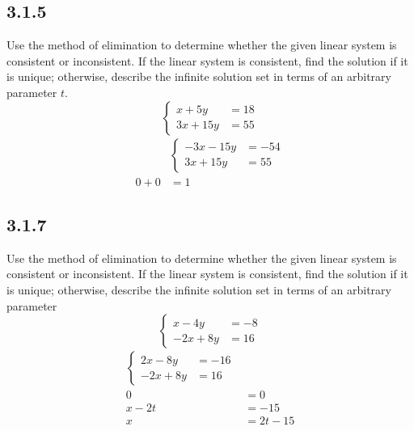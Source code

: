 \documentclass{article}
\begin{document}
\subsection{3.1.5}
Use the method of elimination to determine whether the given linear system is consistent or inconsistent. If the linear system is consistent, find the solution if it is unique; otherwise, describe the infinite solution set in terms of an arbitrary parameter $ t $.
\begin{equation*}
	\left\{
		\begin{aligned}
			x + 5y & = 18 \\
			3x + 15y & = 55
		\end{aligned}
	\right.
\end{equation*}
\begin{align*}
	& \left\{
		\begin{aligned}
			-3x - 15y & = -54 \\
			3x + 15y & = 55
		\end{aligned}
	\right. \\
	0 + 0 & = 1
\end{align*}

\subsection{3.1.7}
Use the method of elimination to determine whether the given linear system is consistent or inconsistent. If the linear system is consistent, find the solution if it is unique; otherwise, describe the infinite solution set in terms of an arbitrary parameter
\begin{equation*}
	\left\{
		\begin{aligned}
			x - 4y & = -8 \\
			-2x + 8y & = 16
		\end{aligned}
	\right.
\end{equation*}
\begin{align*}
	\left\{
		\begin{aligned}
			2x - 8y & = -16 \\
			-2x + 8y & = 16
		\end{aligned}
	\right. \\
	0 & = 0 \\
	x - 2t & = -15 \\
	x & = 2t - 15
\end{align*}
\end{document}
